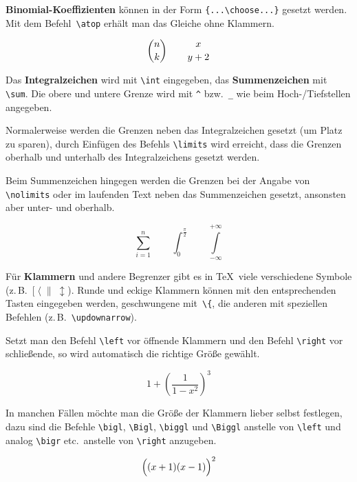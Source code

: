 \textbf{Binomial-Koeffizienten} können in der Form
\lstinline|{...\choose...}| gesetzt werden.
Mit dem Befehl~\lstinline|\atop| erhält man das Gleiche ohne
Klammern.

\begin{LTXexample}
\[
{ n \choose k } \qquad
{ x\atop y+2 }
\]
\end{LTXexample}


\medskip

Das \textbf{Integralzeichen} wird mit \lstinline|\int| eingegeben, das
\textbf{Summenzeichen} mit \lstinline|\sum|.
Die obere und untere Grenze wird mit \lstinline|^| bzw.~\lstinline|_| wie
beim \mbox{Hoch-}\slash Tiefstellen angegeben.

Normalerweise werden die Grenzen neben das Integralzeichen
gesetzt (um Platz zu sparen), durch Einfügen des Befehls
\lstinline|\limits| wird erreicht, dass die Grenzen oberhalb und
unterhalb des Integralzeichens gesetzt werden.

Beim Summenzeichen hingegen werden die Grenzen bei der Angabe von
\lstinline|\nolimits| oder im laufenden Text neben das Summenzeichen
gesetzt, ansonsten aber unter- und oberhalb.

\begin{LTXexample}
\[
\sum_{i=1}^{n} \qquad
\int_{0}^{\frac{\pi}{2}} \qquad
\int \limits_{-\infty}^{+\infty}
\]
\end{LTXexample}

Für \textbf{Klammern} und andere Begrenzer gibt es in \TeX\
viele verschiedene Symbole
(z.\,B.~\([\;\langle\;\|\;\updownarrow\)).
Runde und eckige Klammern können mit den entsprechenden Tasten
eingegeben werden, geschwungene mit~\lstinline|\{|, die anderen mit
speziellen Befehlen (z.\,B.~\lstinline|\updownarrow|).

Setzt man den Befehl \lstinline|\left| vor öffnende Klammern und den
Befehl \lstinline|\right| vor schließende, so wird automatisch die
richtige Größe gewählt.

\begin{LTXexample}
\[
1 + \left( \frac{1}{ 1-x^{2} }
    \right) ^3
\]
\end{LTXexample}


In manchen Fällen möchte man die Größe der Klammern lieber
selbst festlegen, dazu sind die Befehle
\lstinline|\bigl|,
\lstinline|\Bigl|,
\lstinline|\biggl| und
\lstinline|\Biggl| anstelle von \lstinline|\left|
und analog \lstinline|\bigr| etc.\ anstelle von \lstinline|\right|
anzugeben.

\begin{LTXexample}
\[
\Bigl( (x+1) (x-1) \Bigr) ^{2}
\]
\end{LTXexample}

